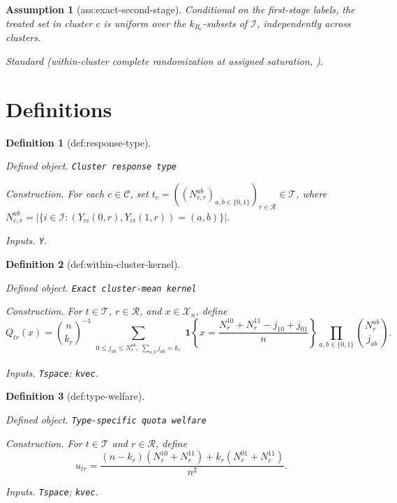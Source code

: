 \documentclass{article}
\newtheorem{assumption}{Assumption}
\newtheorem{definition}{Definition}
\begin{document}
\begin{assumption}[ass:exact-second-stage]\label{ass:exact-second-stage}
Conditional on the first-stage labels, the treated set in cluster \(c\) is uniform over the \(k_{R_c}\)-subsets of \(\mathcal I\), independently across clusters.
\par\smallskip\noindent\emph{Standard} (within-cluster complete randomization at assigned saturation, \cite{JiangImaiMalani2023}).
\end{assumption}

\section{Definitions}

\begin{definition}[def:response-type]\label{def:response-type}
\par\smallskip\noindent\emph{Defined object.} \texttt{Cluster response type}
\par\smallskip\noindent\emph{Construction.} For each \(c\in\mathcal C\), set \(t_c=((N_{c,r}^{ab})_{a,b\in\{0,1\}})_{r\in\mathcal R}\in\mathcal T\), where \(N_{c,r}^{ab}=|\{i\in\mathcal I:(Y_{ci}(0,r),Y_{ci}(1,r))=(a,b)\}|\).
\par\smallskip\noindent\emph{Inputs.} \texttt{Y}.
\end{definition}

\begin{definition}[def:within-cluster-kernel]\label{def:within-cluster-kernel}
\par\smallskip\noindent\emph{Defined object.} \texttt{Exact cluster-\allowbreak{}mean kernel}
\par\smallskip\noindent\emph{Construction.} For \(t\in\mathcal T\), \(r\in\mathcal R\), and \(x\in\mathcal X_n\), define \[Q_{tr}(x)=\binom{n}{k_r}^{-1}\sum_{\substack{0\le j_{ab}\le N_r^{ab},\ \sum_{a,b}j_{ab}=k_r}}\mathbf 1\!\left\{x=\frac{N_r^{10}+N_r^{11}-j_{10}+j_{01}}{n}\right\}\prod_{a,b\in\{0,1\}}\binom{N_r^{ab}}{j_{ab}}.\]
\par\smallskip\noindent\emph{Inputs.} \texttt{Tspace}; \texttt{kvec}.
\end{definition}

\begin{definition}[def:type-welfare]\label{def:type-welfare}
\par\smallskip\noindent\emph{Defined object.} \texttt{Type-\allowbreak{}specific quota welfare}
\par\smallskip\noindent\emph{Construction.} For \(t\in\mathcal T\) and \(r\in\mathcal R\), define \[u_{tr}=\frac{(n-k_r)(N_r^{10}+N_r^{11})+k_r(N_r^{01}+N_r^{11})}{n^2}.\]
\par\smallskip\noindent\emph{Inputs.} \texttt{Tspace}; \texttt{kvec}.
\end{definition}
\end{document}
